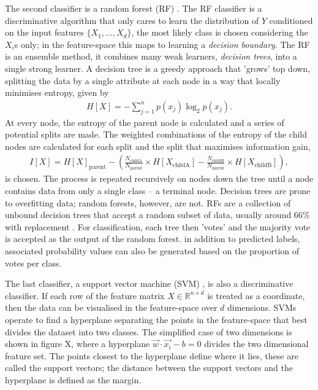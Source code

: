         The second classifier is a random forest (RF) \cite{Breiman2001}. The RF classifier is a discriminative algorithm that only cares to learn the distribution of $Y$ conditioned on the input features $\{X_1,...,X_d\}$, the most likely class is chosen considering the $X_i$s only; in the feature-space this maps to learning a \textit{decision boundary}. The RF is an ensemble method, it combines many weak learners, \textit{decision trees}, into a single strong learner. A decision tree is a greedy approach that 'grows' top down, splitting the data by a single attribute at each node in a way that locally minimises entropy, given by
        \begin{align}
            H[X] = -\sum^n_{j=1}p(x_j)\log_2p(x_j).
        \end{align}
        At every node, the entropy of the parent node is calculated and a series of potential splits are made. The weighted combinations of the entropy of the child nodes are calculated for each split and the split that maximises information gain,
        \begin{align}
            I[X] = H[X]_{\text{parent}} - (\frac{N_{\text{childA}}}{N_{\text{parent}}}\times H[X_{\text{childA}}] - \frac{N_{\text{childB}}}{N_{\text{parent}}}\times H[X_{\text{childB}}]),
        \end{align}
        is chosen. The process is repeated recursively on nodes down the tree until a node contains data from only a single class -- a terminal node. Decision trees are prone to overfitting data; random forests, however, are not. RFs are a collection of unbound decision trees that accept a random subset of data, usually around 66\% with replacement \cite{Breiman2001}. For classification, each tree then 'votes' and the majority vote is accepted as the output of the random forest. in addition to predicted labels, associated probability values can also be generated based on the proportion of votes per class.
        
        The last classifier, a support vector machine (SVM) \cite{Vapnik1998}, is also a discriminative classifier. If each row of the feature matrix $X\in\mathbb{R}^{n\times d}$ is treated as a coordinate, then the data can be visualised in the feature-space over $d$ dimensions. SVMs operate to find a hyperplane separating the points in the feature-space that best divides the dataset into two classes. The simplified case of two dimensions is shown in figure X, where a hyperplane $\vec{w}\cdot\vec{x_i}-b=0$
        divides the two dimensional feature set. The points closest to the hyperplane define where it lies, these are called the support vectors; the distance between the support vectors and the hyperplane is defined as the margin.
        

